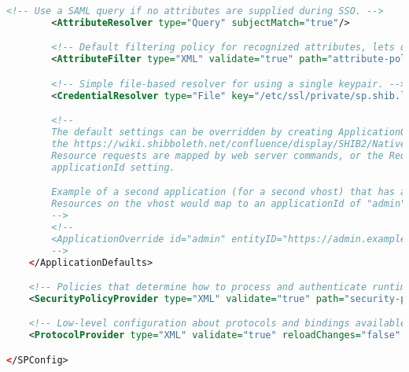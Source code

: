 \begin{lstlisting}[language=xml]
        <!-- Use a SAML query if no attributes are supplied during SSO. -->
        <AttributeResolver type="Query" subjectMatch="true"/>

        <!-- Default filtering policy for recognized attributes, lets other data pass. -->
        <AttributeFilter type="XML" validate="true" path="attribute-policy.xml"/>

        <!-- Simple file-based resolver for using a single keypair. -->
        <CredentialResolver type="File" key="/etc/ssl/private/sp.shib.lan_key.pem" certificate="/etc/ssl/certs/sp.shib.lan_cert.pem"/>

        <!--
        The default settings can be overridden by creating ApplicationOverride elements (see
        the https://wiki.shibboleth.net/confluence/display/SHIB2/NativeSPApplicationOverride topic).
        Resource requests are mapped by web server commands, or the RequestMapper, to an
        applicationId setting.

        Example of a second application (for a second vhost) that has a different entityID.
        Resources on the vhost would map to an applicationId of "admin":
        -->
        <!--
        <ApplicationOverride id="admin" entityID="https://admin.example.org/shibboleth"/>
        -->
    </ApplicationDefaults>

    <!-- Policies that determine how to process and authenticate runtime messages. -->
    <SecurityPolicyProvider type="XML" validate="true" path="security-policy.xml"/>

    <!-- Low-level configuration about protocols and bindings available for use. -->
    <ProtocolProvider type="XML" validate="true" reloadChanges="false" path="protocols.xml"/>

</SPConfig>
\end{lstlisting}

